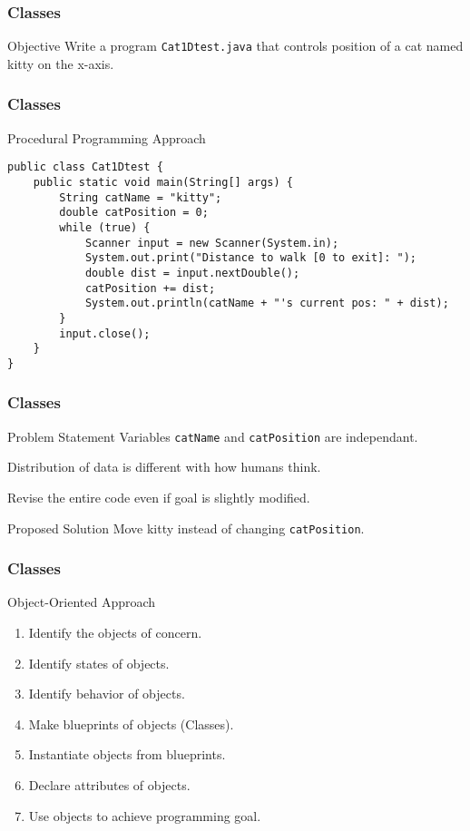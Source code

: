 \documentclass[10pt, compress]{beamer}
\begin{document}
\begin{frame}[fragile]
	\frametitle{Classes}
	\begin{block}{Objective}
	Write a program \texttt{Cat1Dtest.java} that controls position of a cat named kitty on the x-axis.
	\end{block}
\end{frame}

\begin{frame}[fragile]
	\frametitle{Classes}
	\begin{block}{Procedural Programming Approach}
		\begin{verbatim}
public class Cat1Dtest {
	public static void main(String[] args) {
		String catName = "kitty";
		double catPosition = 0;
		while (true) {
			Scanner input = new Scanner(System.in);
			System.out.print("Distance to walk [0 to exit]: ");
			double dist = input.nextDouble();
			catPosition += dist;
			System.out.println(catName + "'s current pos: " + dist);
		}
		input.close();
	}
}
		\end{verbatim}
	\end{block}
\end{frame}

\begin{frame}[fragile]
	\frametitle{Classes}
	\begin{block}{Problem Statement}
	Variables \texttt{catName} and \texttt{catPosition} are independant.

	Distribution of data is different with how humans think.

	Revise the entire code even if goal is slightly modified.
	\end{block}
	\begin{block}{Proposed Solution}
	Move \alert{kitty} instead of changing \texttt{catPosition}.
	\end{block}
\end{frame}

\begin{frame}[fragile]
	\frametitle{Classes}
	\begin{block}{Object-Oriented Approach}
	\begin{enumerate}
		\item[] Identify the objects of concern.
		\item[] Identify states of objects.
		\item[] Identify behavior of objects.
		\item[] Make blueprints of objects (Classes).
		\item[] Instantiate objects from blueprints.
		\item[] Declare attributes of objects.
		\item[] Use objects to achieve programming goal.
	\end{enumerate}
	\end{block}
\end{frame}
\end{document}
